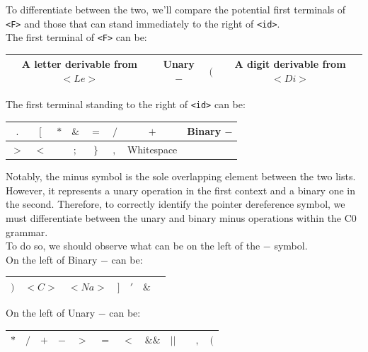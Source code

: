 To differentiate between the two, we'll compare the potential first terminals of \texttt{<F>} and those that can stand immediately to the right of \texttt{<id>}.\\

The first terminal of \texttt{<F>} can be:
\begin{center}
    \begin{tabular}{|c|c|c|c|}
        \hline
        A letter derivable from \( <Le> \) & Unary \( - \) & \( ( \) & A digit derivable from \( <Di> \) \\
        \hline
    \end{tabular}
\end{center}

The first terminal standing to the right of \texttt{<id>} can be:
\begin{center}
    \begin{tabular}{|c|c|c|c|c|c|c|c|}
        \hline
        \( . \) & \( [ \) & \( \ast \) & \( \& \) & \( = \) & \( / \) & \( + \) & Binary \( - \)\\
        \hline
        \( > \) & \( < \) & \( \! \) & \( ; \) & \( \} \) & \( , \) & Whitespace & \\
        \hline
    \end{tabular}
\end{center}

Notably, the minus symbol is the sole overlapping element between the two lists. However, it represents a unary operation in the first context and a binary one in the second. Therefore, to correctly identify the pointer dereference symbol, we must differentiate between the unary and binary minus operations within the C0 grammar.\\

To do so, we should observe what can be on the left of the \(-\) symbol.\\

On the left of Binary \(-\) can be:
\begin{center}
    \begin{tabular}{|c|c|c|c|c|c|c|}
        \hline
        \( ) \) & \( <C> \) & \( <Na> \) & \( ] \) & \( ' \) & \( \& \)\\
        \hline
    \end{tabular}
\end{center}

On the left of Unary \(-\) can be:
\begin{center}
    \begin{tabular}{|c|c|c|c|c|c|c|c|c|c|c|c|}
        \hline
        \( \ast \) & \( / \) & \( + \) & \( - \) & \( > \) & \( = \) & \( < \) & \( \&\& \) & \( || \) & \( \) & \( , \) & \( ( \)\\
        \hline
    \end{tabular}
\end{center}

